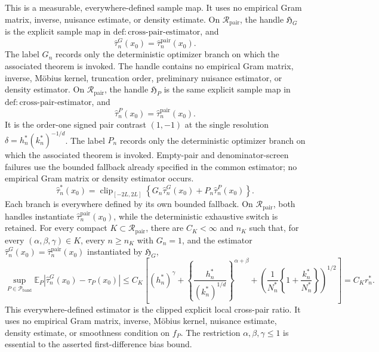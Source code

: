 This is a measurable, everywhere-defined sample map.  It uses no empirical Gram matrix, inverse, nuisance estimate, or density estimate.
On \(\mathcal R_{\mathrm{pair}}\), the handle \(\mathfrak H_G\) is the explicit sample map in \(\mathrm{def:cross\mbox{-}pair\mbox{-}estimator}\), and
\[
 \widehat\tau_n^G(x_0)=\widehat\tau_n^{\mathrm{pair}}(x_0).
\]
The label \(G_n\) records only the deterministic optimizer branch on which the associated theorem is invoked.  The handle contains no empirical Gram matrix, inverse, M\"obius kernel, truncation order, preliminary nuisance estimator, or density estimator.
On \(\mathcal R_{\mathrm{pair}}\), the handle \(\mathfrak H_P\) is the same explicit sample map in \(\mathrm{def:cross\mbox{-}pair\mbox{-}estimator}\), and
\[
 \widehat\tau_n^P(x_0)=\widehat\tau_n^{\mathrm{pair}}(x_0).
\]
It is the order-one signed pair contrast \((1,-1)\) at the single resolution \(\delta=h_n^*(k_n^*)^{-1/d}\).  The label \(P_n\) records only the deterministic optimizer branch on which the associated theorem is invoked.  Empty-pair and denominator-screen failures use the bounded fallback already specified in the common estimator; no empirical Gram matrix or density estimator occurs.
\[
 \widehat\tau_n^*(x_0)=\operatorname{clip}_{[-2L,2L]}
 \left\{G_n\widehat\tau_n^G(x_0)+P_n\widehat\tau_n^P(x_0)\right\}.
\]
Each branch is everywhere defined by its own bounded fallback.  On \(\mathcal R_{\mathrm{pair}}\), both handles instantiate \(\widehat\tau_n^{\mathrm{pair}}(x_0)\), while the deterministic exhaustive switch is retained.
For every compact \(K\subset\mathcal R_{\mathrm{pair}}\), there are \(C_K<\infty\) and \(n_K\) such that, for every \((\alpha,\beta,\gamma)\in K\), every \(n\geq n_K\) with \(G_n=1\), and the estimator \(\widehat\tau_n^G(x_0)=\widehat\tau_n^{\mathrm{pair}}(x_0)\) instantiated by \(\mathfrak H_G\),
\[
 \sup_{P\in\mathcal P_{\mathrm{band}}}
 \mathbb E_P\left|\widehat\tau_n^G(x_0)-\tau_P(x_0)\right|
 \leq C_K\left[(h_n^*)^\gamma+
 \left\{\frac{h_n^*}{(k_n^*)^{1/d}}\right\}^{\alpha+\beta}
 +\left(\frac1{N_n^*}\left\{1+\frac{k_n^*}{N_n^*}\right\}\right)^{1/2}\right]
 =C_Kr_n^*.
\]
This everywhere-defined estimator is the clipped explicit local cross-pair ratio.  It uses no empirical Gram matrix, inverse, M\"obius kernel, nuisance estimate, density estimate, or smoothness condition on \(f_P\).  The restriction \(\alpha,\beta,\gamma\leq1\) is essential to the asserted first-difference bias bound.
